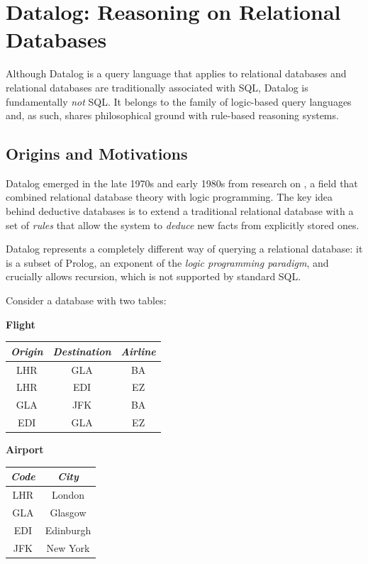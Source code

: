 \chapter{Datalog: Reasoning on Relational Databases}

Although Datalog is a query language that applies to relational databases and relational databases are traditionally associated with SQL, Datalog is fundamentally \emph{not} SQL. 
It belongs to the family of logic-based query languages and, as such, shares philosophical ground with rule-based reasoning systems. 

\section{Origins and Motivations}

Datalog emerged in the late 1970s and early 1980s from research on , a field that combined relational database theory with logic programming. 
The key idea behind deductive databases is to extend a traditional relational database with a set of \emph{rules} that allow the system to \emph{deduce} new facts from explicitly stored ones. 

Datalog represents a completely different way of querying a relational database: it is a subset of Prolog, an exponent of the \emph{logic programming paradigm}, and crucially allows recursion, which is not supported by standard SQL.

Consider a database with two tables:

\vspace{0.5cm}
\begin{minipage}{0.45\textwidth}
    \centering
    \textbf{Flight}
    \begin{tabular}{ccc}
        \toprule
        \textit{Origin} & \textit{Destination} & \textit{Airline} \\
        \midrule
        LHR & GLA & BA \\
        LHR & EDI & EZ \\
        GLA & JFK & BA \\
        EDI & GLA & EZ \\
        \bottomrule
    \end{tabular}
\end{minipage}
\hfill
\begin{minipage}{0.45\textwidth}
    \centering
    \textbf{Airport}
    \begin{tabular}{cc}
        \toprule
        \textit{Code} & \textit{City} \\
        \midrule
        LHR & London \\
        GLA & Glasgow \\
        EDI & Edinburgh \\
        JFK & New York \\
        \bottomrule
    \end{tabular}
\end{minipage}
\vspace{0.5cm}


